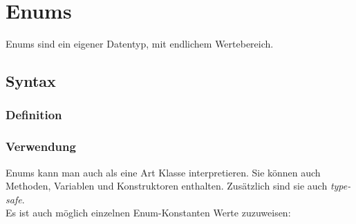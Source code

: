 \section{Enums}
Enums sind ein eigener Datentyp, mit endlichem Wertebereich.

\subsection{Syntax}
\vspace{-0.8\abovedisplayskip}
\begin{minipage}[t]{0.48\columnwidth}
    \subsubsection{Definition}
    
\end{minipage}\hfill
\begin{minipage}[t]{0.51\columnwidth}
    \subsubsection{Verwendung}
    
\end{minipage}
Enums kann man auch als eine Art Klasse interpretieren. Sie können auch Methoden, Variablen und Konstruktoren enthalten. 
Zusätzlich sind sie auch \textit{type-safe}.\\
Es ist auch möglich einzelnen Enum-Konstanten Werte zuzuweisen:
